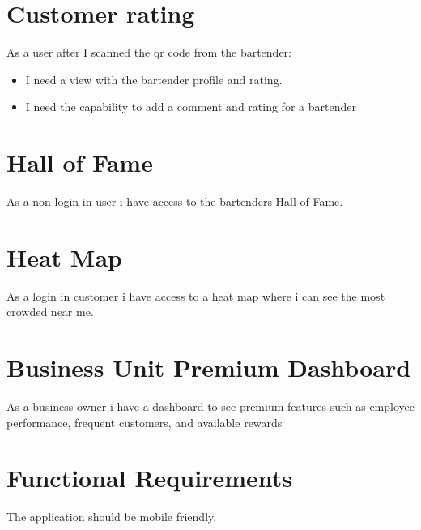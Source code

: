 \documentclass{scrreprt}
\begin{document}
\section{Customer rating}
As a user after I scanned the qr code from the bartender:
\begin{itemize}
    \item I need a view with the bartender profile and rating.
    \item I need the capability to add a comment and rating for a bartender
\end{itemize}

\section{Hall of Fame}
As a non login in user i have access to the bartenders Hall of Fame.

\section{Heat Map}
As a login in customer i have access to a heat map where i can see the most crowded near me.

\section{Business Unit Premium Dashboard}
As a business owner i have a dashboard to see premium features such as employee performance, frequent customers, and available rewards

\section{Functional Requirements}
The application should be mobile friendly.
\end{document}

